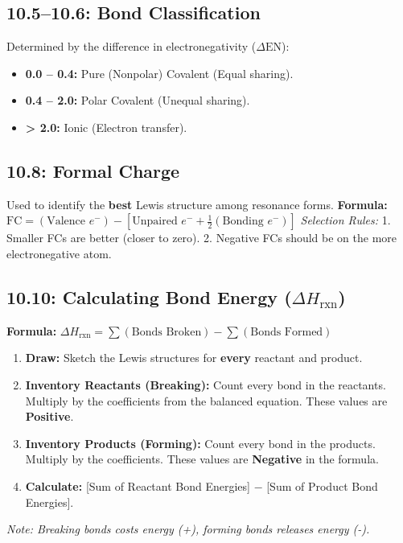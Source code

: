 \documentclass[11pt]{article}
\begin{document}
\subsection{10.5--10.6: Bond Classification}
Determined by the difference in electronegativity ($\Delta\text{EN}$):
\begin{itemize}
    \item \textbf{0.0 -- 0.4:} Pure (Nonpolar) Covalent (Equal sharing).
    \item \textbf{0.4 -- 2.0:} Polar Covalent (Unequal sharing).
    \item \textbf{> 2.0:} Ionic (Electron transfer).
\end{itemize}

\subsection{10.8: Formal Charge}
Used to identify the \textbf{best} Lewis structure among resonance forms.
\textbf{Formula:} $\text{FC} = (\text{Valence } e^-) - [\text{Unpaired } e^- + \frac{1}{2}(\text{Bonding } e^-)]$
\textit{Selection Rules:}
1. Smaller FCs are better (closer to zero).
2. Negative FCs should be on the more electronegative atom.

\subsection{10.10: Calculating Bond Energy ($\Delta H_{\text{rxn}}$)}
\begin{tcolorbox}[colframe=chemblue, title=Meticulous Method: Step-by-Step $\Delta H_{\text{rxn}}$]
    \textbf{Formula:} $\Delta H_{\text{rxn}} = \sum (\text{Bonds Broken}) - \sum (\text{Bonds Formed})$
    \begin{enumerate}
        \item \textbf{Draw:} Sketch the Lewis structures for \textbf{every} reactant and product.
        \item \textbf{Inventory Reactants (Breaking):} Count every bond in the reactants. Multiply by the coefficients from the balanced equation. These values are \textbf{Positive}.
        \item \textbf{Inventory Products (Forming):} Count every bond in the products. Multiply by the coefficients. These values are \textbf{Negative} in the formula.
        \item \textbf{Calculate:} [Sum of Reactant Bond Energies] $-$ [Sum of Product Bond Energies].
    \end{enumerate}
    \textit{Note: Breaking bonds costs energy (+), forming bonds releases energy (-).}
\end{tcolorbox}
\end{document}

